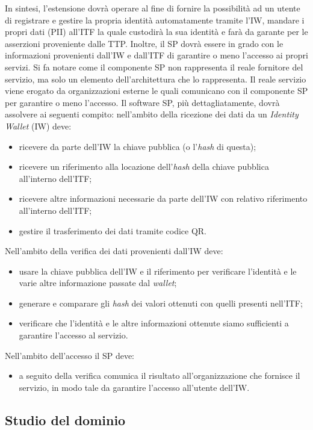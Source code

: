 In sintesi, l’estensione dovrà operare al fine di fornire la possibilità ad un utente di registrare e gestire la propria identità automatamente tramite l’IW, mandare i propri dati (PII) all’ITF la quale custodirà la sua identità e farà da garante per le asserzioni proveniente dalle TTP. Inoltre, il SP dovrà essere in grado con le informazioni provenienti dall’IW e dall’ITF di garantire o meno l’accesso ai propri servizi. Si fa notare come il componente SP non rappresenta il reale fornitore del servizio, ma solo un elemento dell’architettura che lo rappresenta. Il reale servizio viene erogato da organizzazioni esterne le quali comunicano con il componente SP per garantire o meno l’accesso.
Il software SP, più dettagliatamente, dovrà assolvere ai seguenti compito:
nell’ambito della ricezione dei dati da un \emph{Identity Wallet} (IW) deve:
\begin{itemize}
    \item ricevere da parte dell’IW la chiave pubblica (o l’\emph{hash} di questa);
    \item ricevere un riferimento alla locazione dell’\emph{hash} della chiave pubblica all’interno dell’ITF;
    \item ricevere altre informazioni necessarie da parte dell’IW con relativo riferimento all’interno dell’ITF;
    \item gestire il trasferimento dei dati tramite codice QR.
\end{itemize}
Nell’ambito della verifica dei dati provenienti dall’IW deve:
\begin{itemize}
    \item usare la chiave pubblica dell’IW e il riferimento per verificare l’identità e le varie altre informazione passate dal \emph{wallet};
    \item generare e comparare gli \emph{hash} dei valori ottenuti con quelli presenti nell’ITF;
    \item verificare che l’identità e le altre informazioni ottenute siamo sufficienti a garantire l’accesso al servizio.
\end{itemize}
Nell’ambito dell’accesso il SP deve:
\begin{itemize}
    \item a seguito della verifica comunica il risultato all’organizzazione che fornisce il servizio, in modo tale da garantire l’accesso all’utente dell’IW.
\end{itemize}

\subsection{Studio del dominio}

